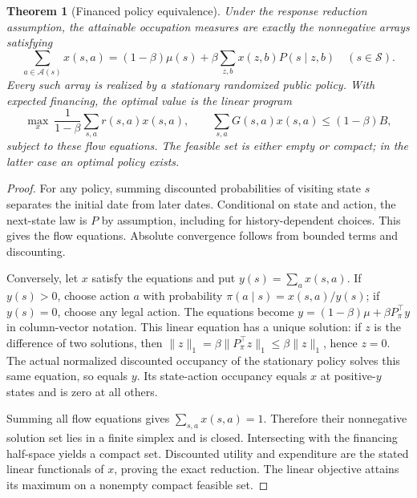 \documentclass[11pt]{article}
\newtheorem{theorem}{Theorem}
\theoremstyle{remark}
\begin{document}
\begin{theorem}[Financed policy equivalence]\label{occupation}
Under the response reduction assumption, the attainable occupation measures are exactly the nonnegative arrays satisfying
\[
 \sum_{a\in\mathcal A(s)}x(s,a)
  =(1-\beta)\mu(s)+\beta\sum_{z,b}x(z,b)P(s\mid z,b)
  \quad(s\in\mathcal S).
\]
Every such array is realized by a stationary randomized public policy. With expected financing, the optimal value is the linear program
\[
 \max_x\ \frac1{1-\beta}\sum_{s,a}r(s,a)x(s,a),\qquad
 \sum_{s,a}G(s,a)x(s,a)\leq(1-\beta)B,
\]
subject to these flow equations. The feasible set is either empty or compact; in the latter case an optimal policy exists.
\end{theorem}
\begin{proof}
For any policy, summing discounted probabilities of visiting state $s$ separates the initial date from later dates. Conditional on state and action, the next-state law is $P$ by assumption, including for history-dependent choices. This gives the flow equations. Absolute convergence follows from bounded terms and discounting.

Conversely, let $x$ satisfy the equations and put $y(s)=\sum_ax(s,a)$. If $y(s)>0$, choose action $a$ with probability $\pi(a\mid s)=x(s,a)/y(s)$; if $y(s)=0$, choose any legal action. The equations become
$y=(1-\beta)\mu+\beta P_\pi^\top y$ in column-vector notation. This linear equation has a unique solution: if $z$ is the difference of two solutions, then
$\|z\|_1=\beta\|P_\pi^\top z\|_1\leq\beta\|z\|_1$, hence $z=0$. The actual normalized discounted occupancy of the stationary policy solves this same equation, so equals $y$. Its state-action occupancy equals $x$ at positive-$y$ states and is zero at all others.

Summing all flow equations gives $\sum_{s,a}x(s,a)=1$. Therefore their nonnegative solution set lies in a finite simplex and is closed. Intersecting with the financing half-space yields a compact set. Discounted utility and expenditure are the stated linear functionals of $x$, proving the exact reduction. The linear objective attains its maximum on a nonempty compact feasible set.
\end{proof}
\end{document}
